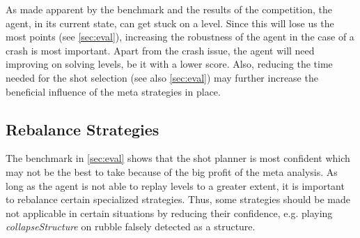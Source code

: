 As made apparent by the benchmark and the results of the competition, the agent, in its current state, can get stuck on a level. Since this will lose us the most points (see \ref{sec:eval}), increasing the robustness of the agent in the case of a crash is most important. Apart from the crash issue, the agent will need improving on solving levels, be it with a lower score. Also, reducing the time needed for the shot selection (see also \ref{sec:eval}) may further increase the beneficial influence of the meta strategies in place.

\subsection{Rebalance Strategies}

The benchmark in \ref{sec:eval} shows that the shot planner is most confident which may not be the best to take because of the big profit of the meta analysis. As long as the agent is not able to replay levels to a greater extent, it is important to rebalance certain specialized strategies. Thus, some strategies should be made not applicable in certain situations by reducing their confidence, e.g. playing \emph{collapseStructure} on rubble falsely detected as a structure.